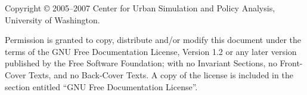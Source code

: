 
Copyright \copyright{} 2005--2007
Center for Urban Simulation and Policy Analysis,
University of Washington.  

Permission is granted to copy, distribute and/or
modify this document under the terms of the GNU Free Documentation License,
Version 1.2 or any later version published by the Free Software Foundation;
with no Invariant Sections, no Front-Cover Texts, and no Back-Cover Texts.
A copy of the license is included in the section entitled ``GNU Free
Documentation License''.

